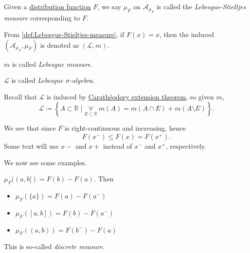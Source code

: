 \begin{definition}\label{def:Lebesgue-Stieltjes-measure}
	Given a \hyperref[def:distribution-function]{distribution function} \(F\), we say \(\mu _F\) on \(\mathcal{A} _{\mu _F}\) is called the \emph{Lebesgue-Stieltjes measure} corresponding to \(F\).
\end{definition}

\begin{definition*}
	From \autoref{def:Lebesgue-Stieltjes-measure}, if \(F(x)=x\), then the induced \((\mathcal{A} _{\mu _F}, \mu _{F})\) is denoted as \((\mathcal{L} , m)\).
	\begin{definition}\label{def:Lebesgue-measure}
		\(m\) is called \emph{Lebesgue measure}.
	\end{definition}
	\begin{definition}\label{def:Lebesgue-sigma-algebra}
		\(\mathcal{L} \) is called \emph{Lebesgue \(\sigma\)-algebra}.
	\end{definition}
\end{definition*}


\begin{remark}
	Recall that \(\mathcal{L} \) is induced by \hyperref[thm:Caratheodory-extension]{Carathéodory extension theorem}, so given \(m\),
	\[
		\mathcal{L} \coloneqq \left\{A\subset \mathbb{R} \mid \underset{E\subset \mathbb{R} }{\forall }\ m(A) = m(A\cap E) + m(A\setminus E)\right\}.
	\]
\end{remark}

\begin{note}
	We see that since \(F\) is right-continuous and increasing, hence
	\[
		F(x^-)\leq F(x) = F(x^+).
	\]
	Some text will use \(x-\) and \(x+\) instead of \(x^-\) and \(x^+\), respectively.
\end{note}

We now see some examples.

\begin{eg}\label{eg:discrete-measure}
	\(\mu _F((a, b]) = F(b) - F(a)\). Then
	\begin{itemize}
		\item \(\mu _F(\{a\}) = F(a) - F(a^-)\)
		\item \(\mu _F([a, b]) = F(b) - F(a^-)\)
		\item \(\mu _F((a, b)) = F(b^-) - F(a)\)
	\end{itemize}
	This is so-called \emph{discrete measure}.
\end{eg}


